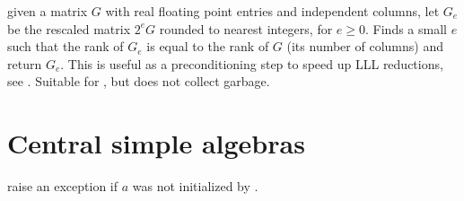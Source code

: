 
 given a matrix $G$ with real floating
point entries and independent columns, let $G_e$ be the
rescaled matrix $2^e G$ rounded to nearest integers, for $e \geq 0$.
Finds a small $e$ such that the rank of $G_e$ is equal to the rank of $G$
(its number of columns) and return $G_e$. This is useful as a preconditioning
step to speed up LLL reductions, see .
Suitable for , but does not collect garbage.

\section{Central simple algebras}

 raise an exception if $a$ was not initialized
by .

\newpage
